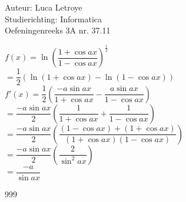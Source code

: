 \documentclass[a4paper]{article}
\begin{document}
  
\noindent \large Auteur: Luca Letroye        \\
\noindent \large Studierichting: Informatica \\
\noindent \large Oefeningenreeks 3A nr. 37.11 \\

\medskip

\normalsize

$f(x) = \ln\left(\dfrac{1+\cos ax}{1- \cos ax} \right)^{\tfrac{1}{2}}$\\

$= \dfrac{1}{2}\left(\ln(1+\cos ax) - \ln(1-\cos ax)\right)$\\

$f'(x) = \dfrac{1}{2}\left( \dfrac{-a\sin ax}{1+\cos ax} - \dfrac{a\sin ax}{ 1-\cos ax} \right)$\\

$ = \dfrac{-a\sin ax}{2}\left( \dfrac{1}{1+\cos ax} + \dfrac{1}{ 1-\cos ax} \right)$\\

$ = \dfrac{-a\sin ax}{2}\left( \dfrac{(1-\cos ax) + (1+ \cos ax)}{(1+\cos ax)(1-\cos ax)}  \right)$\\

$ = \dfrac{-a\sin ax}{2}\left( \dfrac{2}{\sin^2 ax}  \right)$\\

$ = \dfrac{-a}{\sin ax}$\\


\begin{thebibliography}{999}
\end{thebibliography}
\end{document}

